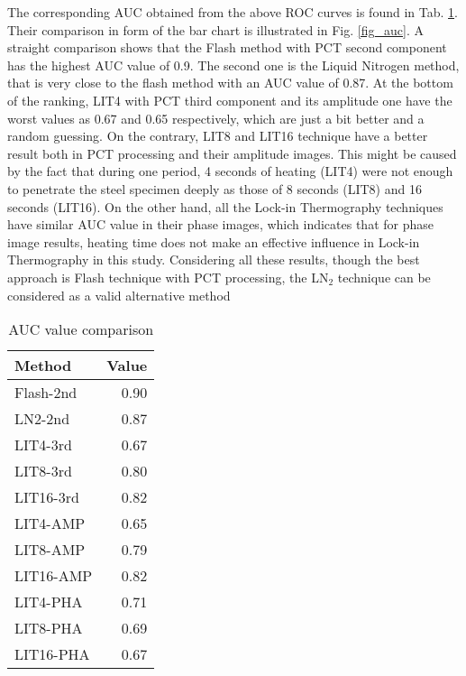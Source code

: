 The corresponding AUC obtained from the above ROC curves is found in Tab. \ref{tab_auc}. Their comparison in form of the bar chart is illustrated in Fig. \ref{fig_auc}. A straight comparison shows that the Flash method with PCT second component has the highest AUC value of 0.9. The second one is the Liquid Nitrogen method, that is very close to the flash method with an AUC value of 0.87. At the bottom of the ranking, LIT4 with PCT third component and its amplitude one have the worst values as  0.67 and 0.65 respectively, which are just a bit better and a random guessing.
On the contrary, LIT8 and LIT16 technique have a better result both in PCT processing and their amplitude images. This might be caused by the fact that during one period, 4 seconds of heating (LIT4) were not enough to penetrate the steel specimen deeply as those of 8 seconds (LIT8) and 16 seconds (LIT16). On the other hand, all the Lock-in Thermography techniques have similar AUC value in their phase images, which indicates that for phase image results, heating time does not make an effective influence in Lock-in Thermography in this study. Considering all these results, though the best approach is Flash technique with PCT processing, the LN$_2$ technique can be considered as a valid alternative method

\begin{table}[htbp]
    \centering
    \begin{tabular}{lr}%
    \toprule
    \textbf{Method} & \textbf{Value} \\
    \midrule
    Flash-2nd & 0.90 \\
    LN2-2nd & 0.87 \\
    \midrule
    LIT4-3rd & 0.67 \\
    LIT8-3rd & 0.80 \\
    LIT16-3rd & 0.82 \\
    \midrule
    LIT4-AMP & 0.65 \\
    LIT8-AMP & 0.79 \\
    LIT16-AMP & 0.82 \\
    \midrule
    LIT4-PHA & 0.71 \\
    LIT8-PHA & 0.69 \\
    LIT16-PHA & 0.67 \\

    \bottomrule
    \end{tabular}
    \caption{AUC value comparison}
    \label{tab_auc}
\end{table}

